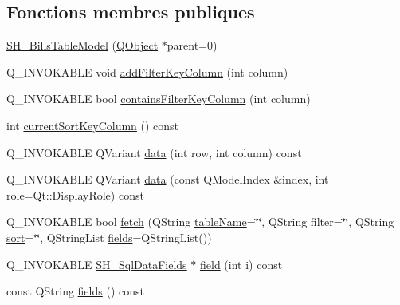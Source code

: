 \subsection*{Fonctions membres publiques}
\begin{DoxyCompactItemize}
\item 
\hyperlink{classSimpleHotel_1_1SH__BillsTableModel_a1a0bc03bb16c331703298d9a2e16d1c5}{S\-H\-\_\-\-Bills\-Table\-Model} (\hyperlink{classQObject}{Q\-Object} $\ast$parent=0)
\item 
Q\-\_\-\-I\-N\-V\-O\-K\-A\-B\-L\-E void \hyperlink{classSimpleHotel_1_1SH__ExtendedProxyModel_af8036ffa208ebaf55129cce307c3e296}{add\-Filter\-Key\-Column} (int column)
\item 
Q\-\_\-\-I\-N\-V\-O\-K\-A\-B\-L\-E bool \hyperlink{classSimpleHotel_1_1SH__ExtendedProxyModel_a4db5231a36976dd249ec1439422e331c}{contains\-Filter\-Key\-Column} (int column)
\item 
int \hyperlink{classSimpleHotel_1_1SH__ExtendedProxyModel_a2acd8779c72617f4b6a195ee9341b28b}{current\-Sort\-Key\-Column} () const 
\item 
Q\-\_\-\-I\-N\-V\-O\-K\-A\-B\-L\-E Q\-Variant \hyperlink{classSimpleHotel_1_1SH__ExtendedProxyModel_a24edf7c777ce9e00a07b30614ee71019}{data} (int row, int column) const 
\item 
Q\-\_\-\-I\-N\-V\-O\-K\-A\-B\-L\-E Q\-Variant \hyperlink{classSimpleHotel_1_1SH__ExtendedProxyModel_a25bc1047c6e9835d9d3c580e0a4ec42a}{data} (const Q\-Model\-Index \&index, int role=Qt\-::\-Display\-Role) const 
\item 
Q\-\_\-\-I\-N\-V\-O\-K\-A\-B\-L\-E bool \hyperlink{classSimpleHotel_1_1SH__ExtendedProxyModel_a422dc77c44ec3ded9291812efb128053}{fetch} (Q\-String \hyperlink{classSimpleHotel_1_1SH__ExtendedProxyModel_a49617ea8bab745425beec3dbd3fddba7}{table\-Name}=\char`\"{}\char`\"{}, Q\-String filter=\char`\"{}\char`\"{}, Q\-String \hyperlink{classSimpleHotel_1_1SH__ExtendedProxyModel_a5d7686a9fae295e0662057b8450c8a8d}{sort}=\char`\"{}\char`\"{}, Q\-String\-List \hyperlink{classSimpleHotel_1_1SH__ExtendedProxyModel_a4b57bc85b18fa1e71073526abb798fb6}{fields}=Q\-String\-List())
\item 
Q\-\_\-\-I\-N\-V\-O\-K\-A\-B\-L\-E \hyperlink{classSimpleHotel_1_1SH__SqlDataFields}{S\-H\-\_\-\-Sql\-Data\-Fields} $\ast$ \hyperlink{classSimpleHotel_1_1SH__ExtendedProxyModel_ac091225266a35c84307835f40d9b6e9b}{field} (int i) const 
\item 
const Q\-String \hyperlink{classSimpleHotel_1_1SH__ExtendedProxyModel_a4b57bc85b18fa1e71073526abb798fb6}{fields} () const 

\end{DoxyCompactItemize}
